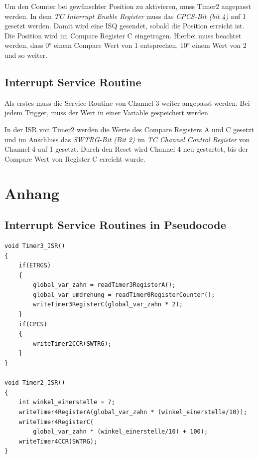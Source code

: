 \documentclass[12pt]{article}
\begin{document}
Um den Counter bei gewünschter Position zu aktivieren, muss Timer2 angepasst werden.
In dem \textit{TC Interrupt Enable Register} muss das \textit{CPCS-Bit (bit 4)} auf 1 gesetzt werden.
Damit wird eine ISQ gesendet, sobald die Position erreicht ist. Die Position wird im Compare Register C eingetragen.
Hierbei muss beachtet werden, dass 0° einem Compare Wert von 1 entsprechen, 10° einem Wert von 2 und so weiter. 

\subsection{Interrupt Service Routine}
Als erstes muss die Service Routine von Channel 3 weiter angepasst werden.
Bei jedem Trigger, muss der Wert in einer Variable gespeichert werden. 

In der ISR von Timer2 werden die Werte des Compare Registers A und C gesetzt und im Anschluss
das \textit{SWTRG-Bit (Bit 2)} im \textit{TC Channel Control Register} von Channel 4 auf 1 gesetzt.
Durch den Reset wird Channel 4 neu gestartet, bis der Compare Wert von Register C erreicht wurde.



\newpage
\section{Anhang}
\subsection{Interrupt Service Routines in Pseudocode}

\begin{lstlisting}
void Timer3_ISR()
{
    if(ETRGS)
    {
        global_var_zahn = readTimer3RegisterA();
        global_var_umdrehung = readTimer0RegisterCounter();
        writeTimer3RegisterC(global_var_zahn * 2);
    }
    if(CPCS)
    {
        writeTimer2CCR(SWTRG);
    }
}

void Timer2_ISR()
{
    int winkel_einerstelle = 7;
    writeTimer4RegisterA(global_var_zahn * (winkel_einerstelle/10));
    writeTimer4RegisterC(
        global_var_zahn * (winkel_einerstelle/10) + 100);
    writeTimer4CCR(SWTRG);
}
\end{lstlisting}
\newpage
\end{document}
